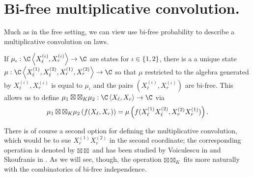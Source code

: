 \section{Bi-free multiplicative convolution.}
\label{sec:bimultconv}
Much as in the free setting, we can view use bi-free probability to describe a multiplicative convolution on laws.
\begin{definition}
	If $\mu_\iota : \C\ang{X^{(\iota)}_\ell, X^{(\iota)}_r} \to \C$ are states for $\iota \in \left\{1,2\right\}$, there is a a unique state $\mu : \C\ang{X_\ell^{(1)}, X_\ell^{(2)}, X_r^{(1)}, X_r^{(2)}} \to \C$ so that $\mu$ restricted to the algebra generated by $X_\ell^{(\iota)}, X_r^{(\iota)}$ is equal to $\mu_\iota$ and the pairs $(X_{\ell}^{(\iota)}, X_r^{(\iota)})$ are bi-free.
	This allows us to define $\mu_1 \boxtimes\boxtimes_K \mu_2 : \C\ang{X_\ell, X_r} \to \C$ via $$\mu_1\boxtimes\boxtimes_K \mu_2\left(f(X_\ell, X_r)\right) = \mu\left(f(X_\ell^{(1)}X_\ell^{(2)}, X_r^{(2)}X_r^{(1)})\right).$$
\end{definition}
There is of course a second option for defining the multiplicative convolution, which would be to sue $X_r^{(1)}X_r^{(2)}$ in the second coordinate; the corresponding operation is denoted by $\boxtimes\boxtimes$ and has been studied by Voiculescu in \cite{voiculescu2016freeiii} and Skoufranis in \cite{skoufranis2016combinatorial}.
As we will see, though, the operation $\boxtimes\boxtimes_K$ fits more naturally with the combinatorics of bi-free independence.


